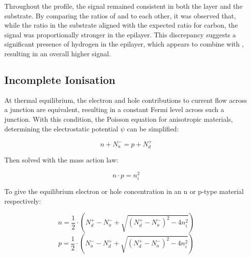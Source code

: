 Throughout the profile, the  signal remained consistent in both the layer and the substrate. By comparing the ratios of  and  to each other, it was observed that, while the ratio in the substrate aligned with the expected ratio for carbon, the  signal was proportionally stronger in the epilayer. This discrepancy suggests a significant presence of hydrogen in the epilayer, which appears to combine with , resulting in an overall higher  signal.

\subsection{Incomplete Ionisation}
At thermal equilibrium, the electron and hole contributions to current flow across a junction are equivalent, resulting in a constant Fermi level across such a junction. With this condition, the Poisson equation for anisotropic materials, determining the electrostatic potential $\psi$ can be simplified:

\begin{equation}
    \label{eq:poisson_3.10_tesfaye}
\end{equation}
\begin{equation}
    n + N^{-}_{a}=p+N^{+}_{d}
    \label{eq:poisson_simplified_tesfaye}
\end{equation}

Then solved with the mass action law:

\begin{equation}
    n\cdot p = n^{2}_{i}
    \label{eq:intrinsic_carriers_3.69_tesfaye}
\end{equation}

To give the equilibrium electron or hole concentration in an n or p-type material respectively:

\begin{equation}
    n=\frac{1}{2}\cdot\left(N^{+}_{d}-N^{-}_{a}+\sqrt{\left(N^{+}_{d}-N^{-}_{a}\right)^{2}-4n^{2}_{i}}\right)
    \label{eq:equilibrium_electron_concentration_3.121_tesfaye}
\end{equation}
\begin{equation}
    p=\frac{1}{2}\cdot\left(N^{-}_{a}-N^{+}_{d}+\sqrt{\left(N^{+}_{d}-N^{-}_{a}\right)^{2}-4n^{2}_{i}}\right)
\end{equation}

